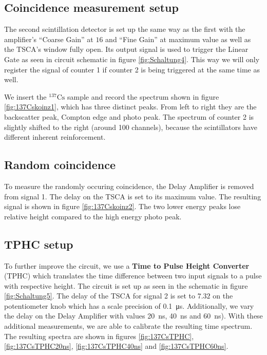 \subsection{Coincidence measurement setup}
%
The second scintillation detector is set up the same way as the first with the amplifier's \enquote{Coarse Gain} at $16$ and \enquote{Fine Gain} at maximum value as well as the TSCA's window fully open.
Its output signal is used to trigger the Linear Gate as seen in circuit schematic in figure \ref{fig:Schaltung4}.
This way we will only register the signal of counter 1 if counter 2 is being triggered at the same time as well.
%
\par
%
We insert the $^{137}\text{Cs}$ sample and record the spectrum shown in figure \ref{fig:137Cskoinz1}, which has three distinct peaks.
From left to right they are the backscatter peak, Compton edge and photo peak.
The spectrum of counter 2 is slightly shifted to the right (around 100 channels), because the scintillators have different inherent reinforcement.
%
\subsection{Random coincidence}
%
To measure the randomly occuring coincidence, the Delay Amplifier is removed from signal 1.
The delay on the TSCA is set to its maximum value.
The resulting signal is shown in figure \ref{fig:137Cskoinz2}.
The two lower energy peaks lose relative height compared to the high energy photo peak.
%
\subsection{TPHC setup}
%
To further improve the circuit, we use a \textbf{Time to Pulse Height Converter} (TPHC) which translates the time difference between two input signals to a pulse with respective height.
The circuit is set up as seen in the schematic in figure \ref{fig:Schaltung5}.
The delay of the TSCA for signal 2 is set to $7.32$ on the potentiometer knob which has a scale precision of \SI{0.1}{\micro\second}.
Additionally, we vary the delay on the Delay Amplifier with values \SI{20}{\nano\second}, \SI{40}{\nano\second} and \SI{60}{\nano\second}).
With these additional measurements, we are able to calibrate the resulting time spectrum.
The resulting spectra are shown in figures \ref{fig:137CsTPHC}, \ref{fig:137CsTPHC20ns}, \ref{fig:137CsTPHC40ns} and \ref{fig:137CsTPHC60ns}.
%
